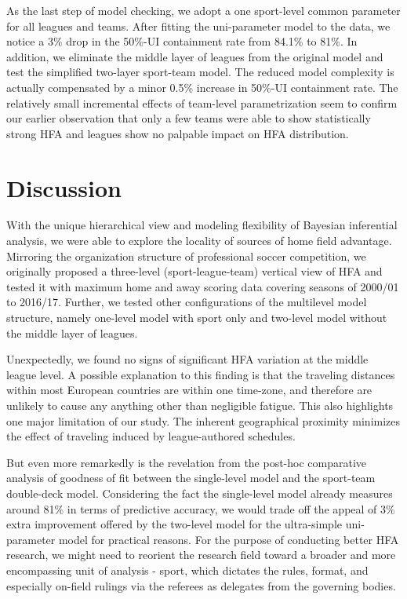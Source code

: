 \documentclass[USenglish]{article}
\begin{document}
As the last step of model checking, we adopt a one sport-level common parameter for all leagues and teams. After fitting the uni-parameter model to the data, we notice a 3\%  drop in the 50\%-UI containment rate from 84.1\% to 81\%.
In addition, we eliminate the middle layer of leagues from the original model and test the simplified two-layer sport-team model. The reduced model complexity is actually compensated by a minor 0.5\% increase in 50\%-UI containment rate.  
The relatively small incremental effects of team-level parametrization seem to confirm our earlier observation that only a few teams were able to show statistically strong HFA and leagues show no palpable impact on HFA distribution.



\section{Discussion}

With the unique hierarchical view and modeling flexibility of Bayesian inferential analysis, we were able to explore the locality of sources of home field advantage. Mirroring the organization structure of professional soccer competition, we originally proposed a three-level (sport-league-team) vertical view of HFA and tested it with maximum home and away scoring data covering seasons of 2000/01 to 2016/17. Further, we tested other configurations of the multilevel model structure, namely one-level model with sport only and two-level model without the middle layer of leagues. 



Unexpectedly, we found no signs of significant HFA variation at the middle league level. 
A possible explanation to this finding is that the traveling distances within most European countries are within one time-zone, and therefore are unlikely to cause any anything other than negligible fatigue. This also highlights one major limitation of our study.  The inherent geographical proximity minimizes the effect of traveling induced by league-authored schedules.

But even more remarkedly is the revelation from the post-hoc comparative analysis of goodness of fit between the single-level model and the sport-team double-deck model. Considering the fact the single-level model already measures around 81\% in terms of predictive accuracy, we would trade off the appeal of 3\% extra improvement offered by the two-level model for the ultra-simple uni-parameter model for practical reasons. For the purpose of conducting better HFA research, we might need to reorient the research field toward a broader and more encompassing unit of analysis - sport, which dictates the rules, format, and especially on-field rulings via the referees as delegates from the governing bodies.
\end{document}
